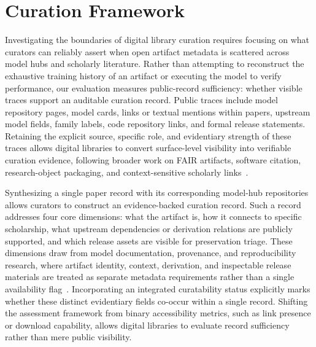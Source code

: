 \section{Curation Framework}
\label{sec:framework}

Investigating the boundaries of digital library curation requires focusing on what curators can reliably assert when open \llm artifact metadata is scattered across model hubs and scholarly literature. Rather than attempting to reconstruct the exhaustive training history of an artifact or executing the model to verify performance, our evaluation measures public-record sufficiency: whether visible traces support an auditable curation record. Public traces include model repository pages, model cards, links or textual mentions within papers, upstream model fields, family labels, code repository links, and formal release statements. Retaining the explicit source, specific role, and evidentiary strength of these traces allows digital libraries to convert surface-level visibility into verifiable curation evidence, following broader work on FAIR artifacts, software citation, research-object packaging, and context-sensitive scholarly links~\cite{wilkinson2016fair,smith2016softwarecitation,soilandreyes2022rocrate,salsabil2025context}.

Synthesizing a single paper record with its corresponding model-hub repositories allows curators to construct an evidence-backed curation record. Such a record addresses four core dimensions: what the artifact is, how it connects to specific scholarship, what upstream dependencies or derivation relations are publicly supported, and which release assets are visible for preservation triage. These dimensions draw from model documentation, provenance, and reproducibility research, where artifact identity, context, derivation, and inspectable release materials are treated as separate metadata requirements rather than a single availability flag~\cite{mitchell2019modelcards,gebru2021datasheets,moreau2013prov,pineau2021reproducibility}. Incorporating an integrated curatability status explicitly marks whether these distinct evidentiary fields co-occur within a single record. Shifting the assessment framework from binary accessibility metrics, such as link presence or download capability, allows digital libraries to evaluate record sufficiency rather than mere public visibility.

